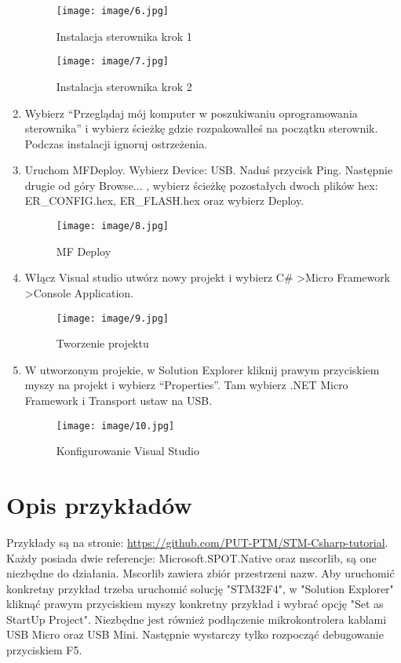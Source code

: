 \documentclass{article}
\begin{document}
\begin{enumerate}
\begin{figure}[H]
\texttt{[image: image/6.jpg]}
\caption{Instalacja sterownika krok 1}
\end{figure}
\begin{figure}[H]
\texttt{[image: image/7.jpg]}
\caption{Instalacja sterownika krok 2}
\end{figure}

\item Wybierz “Przeglądaj mój komputer w poszukiwaniu oprogramowania sterownika” i wybierz ścieżkę gdzie rozpakowalłeś na początku sterownik. Podczas instalacji ignoruj ostrzeżenia.
\item Uruchom MFDeploy. Wybierz Device: USB. Naduś przycisk Ping. Następnie drugie od góry Browse... , wybierz ścieżkę pozostałych dwoch plików hex: ER\_CONFIG.hex, ER\_FLASH.hex oraz wybierz Deploy.

\begin{figure}[H]
\texttt{[image: image/8.jpg]}
\caption{MF Deploy}
\end{figure}
\item Włącz Visual studio utwórz nowy projekt i wybierz C\# \textgreater Micro Framework \textgreater Console Application.

\begin{figure}[H]
\texttt{[image: image/9.jpg]}
\caption{Tworzenie projektu}
\end{figure}
\item W utworzonym projekie, w Solution Explorer kliknij prawym przyciskiem myszy na projekt i wybierz “Properties”. Tam wybierz .NET Micro Framework i Transport ustaw na USB.

\begin{figure}[H]
\texttt{[image: image/10.jpg]}
\caption{Konfigurowanie Visual Studio}
\end{figure}
\end{enumerate}

\section{Opis przykładów}
Przykłady są na stronie: \href{https://github.com/PUT-PTM/STM-Csharp-tutorial}{https://github.com/PUT-PTM/STM-Csharp-tutorial}. Każdy posiada dwie referencje: Microsoft.SPOT.Native oraz mscorlib, są one niezbędne do działania. Mscorlib zawiera zbiór przestrzeni nazw. Aby uruchomić konkretny przykład trzeba uruchomić solucję "STM32F4", w "Solution Explorer" kliknąć prawym przyciskiem myszy konkretny przykład i wybrać opcję "Set as StartUp Project". Niezbędne jest również podłączenie mikrokontrolera kablami USB Micro oraz USB Mini. Następnie wystarczy tylko rozpocząć debugowanie przyciskiem F5.
\end{document}
